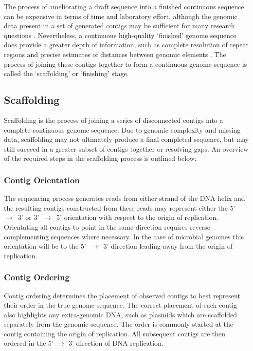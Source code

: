\documentclass[10pt]{bmc_article}
\newenvironment{bmcformat}{\begin{raggedright}\baselineskip20pt\sloppy\setboolean{publ}{false}}{\end{raggedright}\baselineskip20pt\sloppy}
\begin{document}
\begin{bmcformat}
The process of ameliorating a draft sequence into a finished continuous
sequence can be expensive in terms of time and laboratory effort, although the
genomic data present in a set of generated contigs may be sufficient for many
research questions \cite{branscomb2002}. Nevertheless, a continuous
high-quality `finished' genome sequence does provide a greater depth of
information, such as complete resolution of repeat regions and precise
estimates of distances between genomic elements \cite{parkhill2002,fraser2002}.
The process of joining these contigs together to form a continuous genome
sequence is called the `scaffolding' or `finishing' stage. \pb

\subsection*{Scaffolding} %

Scaffolding is the process of joining a series of disconnected contigs into
a complete continuous genome sequence. Due to genomic complexity and missing
data, scaffolding may not ultimately produce a final completed sequence, but
may still succeed in a greater subset of contigs together or resolving gaps. An
overview of the required steps in the scaffolding process is outlined below:

\subsubsection*{Contig Orientation} %

The sequencing process generates reads from either strand of the DNA helix and
the resulting contigs constructed from these reads may represent either the
5'~$\rightarrow$~3' or 3'~$\rightarrow$~5' orientation with respect to the
origin of replication. Orientating all contigs to point in the same direction
requires reverse complementing sequences where necessary. In the case of
microbial genomes this orientation will be to the 5'~$\rightarrow$~3' direction
leading away from the origin of replication.

\subsubsection*{Contig Ordering} %

Contig ordering determines the placement of observed contigs to best represent
their order in the true genome sequence. The correct placement of each contig
also highlights any extra-genomic DNA, such as plasmids which are scaffolded
separately from the genomic sequence. The order is commonly started at the
contig containing the origin of replication. All subsequent contigs are then
ordered in the 5' $\rightarrow$ 3' direction of DNA replication.


\end{bmcformat}
\end{document}

